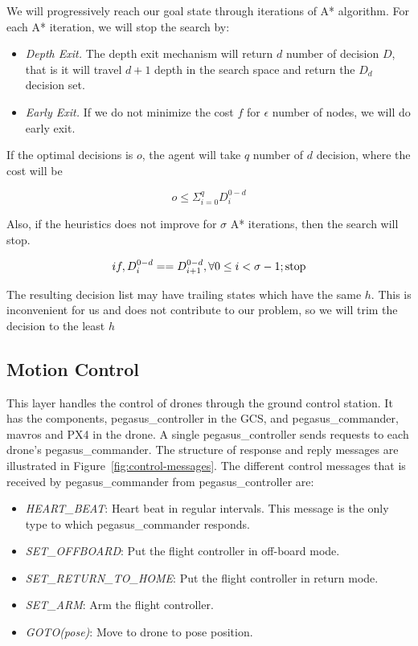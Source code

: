 We will progressively reach our goal state through iterations of A* algorithm. For each A* iteration, we will stop the search by:
\begin{itemize}
	\item \textit{Depth Exit.} The depth exit mechanism will return $d$ number of decision $D$, that is it will travel $d+1$ depth in the search space and return the $D_d$ decision set. 
	\item \textit{Early Exit.} If we do not minimize the cost $f$ for  $\epsilon$ number of nodes, we will do early exit.
	
\end{itemize}

If the optimal decisions is $o$, the agent will take $q$ number of $d$ decision, where the cost will be

$$o \le \Sigma_{i=0}^q D^{0-d}_i$$

Also, if the heuristics does not improve for $\sigma$ A* iterations, then the search will stop.

$$ if, D^{0-d}_i == D^{0-d}_{i+1}, \forall \space 0 \le i < \sigma - 1; \text{stop}$$

The resulting decision list may have trailing states which have the same $h$. This is inconvenient for us and does not contribute to our problem, so we will trim the decision to the least $h$

\subsection{Motion Control}

This layer handles the control of drones through the ground control station. It has the components, pegasus\_controller in the GCS, and pegasus\_commander, mavros and PX4 in the drone. A single pegasus\_controller sends requests to each drone's pegasus\_commander. The structure of response and reply messages are illustrated in Figure~\ref{fig:control-messages}. 
The different control messages that is received by pegasus\_commander from pegasus\_controller are:
\begin{itemize}
	\item \textit{HEART\_BEAT}: Heart beat in regular intervals. This message is the only type to which pegasus\_commander responds.
	\item \textit{SET\_OFFBOARD}: Put the flight controller in off-board mode.
	\item \textit{SET\_RETURN\_TO\_HOME}: Put the flight controller in return mode.
	\item \textit{SET\_ARM}: Arm the flight controller.
	\item \textit{GOTO(pose)}: Move to drone to pose position.
\end{itemize}

